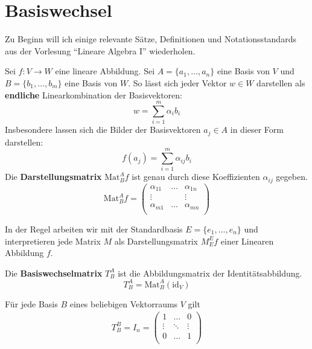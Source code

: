 \documentclass{report}
\newcommand*{\newpar}{\par\vspace{\baselineskip}\noindent}
\begin{document}
\section{Basiswechsel}
Zu Beginn will ich einige relevante Sätze, Definitionen und Notationsstandards aus der Vorlesung ``Lineare Algebra I'' wiederholen.
\begin{definition}
Sei $f: V \to W$ eine lineare Abbildung. Sei $A = \{a_1, \hdots, a_n\}$ eine Basis von $V$ und $B = \{b_1, \hdots, b_m\}$ eine Basis von $W$. So lässt sich jeder Vektor $w \in W$ darstellen als \textbf{endliche} Linearkombination der Basisvektoren:
\begin{equation}
    w = \sum_{i=1}^{m} \alpha_i b_i
\end{equation}
Insbesondere lassen sich die Bilder der Basisvektoren $a_j \in A$ in dieser Form darstellen:
\begin{equation}
    f(a_j) = \sum_{i=1}^{m} \alpha_{ij} b_i
\end{equation}
Die \textbf{Darstellungsmatrix} $\text{Mat}_B^A f$ ist genau durch diese Koeffizienten $\alpha_{ij}$ gegeben.
\begin{equation}
    \text{Mat}_B^A f = 
    \begin{pmatrix}
       \alpha_{11} & \hdots & \alpha_{1n}\\
       \vdots      &        & \vdots\\
       \alpha_{m1} & \hdots & \alpha_{mn}\\
    \end{pmatrix}
\end{equation}
\end{definition}
\newpar
In der Regel arbeiten wir mit der Standardbasis $E = \{e_1, \hdots, e_n\}$ und interpretieren jede Matrix $M$ als Darstellungsmatrix $M_E^E f$ einer Linearen Abbildung $f$. 
\begin{definition}
Die \textbf{Basiswechselmatrix} $T_B^A$ ist die Abbildungsmatrix der Identitätsabbildung.
\begin{equation}
 T_B^A = \text{Mat}_B^A (\text{id}_V)
\end{equation}
\end{definition}
\begin{theorem}
Für jede Basis $B$ eines beliebigen Vektorraums $V$ gilt 
\begin{align}
T_B^B = I_n = \begin{pmatrix}
                1 & \hdots & 0\\
                \vdots & \ddots & \vdots\\
                0 & \hdots & 1\\
               \end{pmatrix}
\end{align}
\end{theorem}
\end{document}
